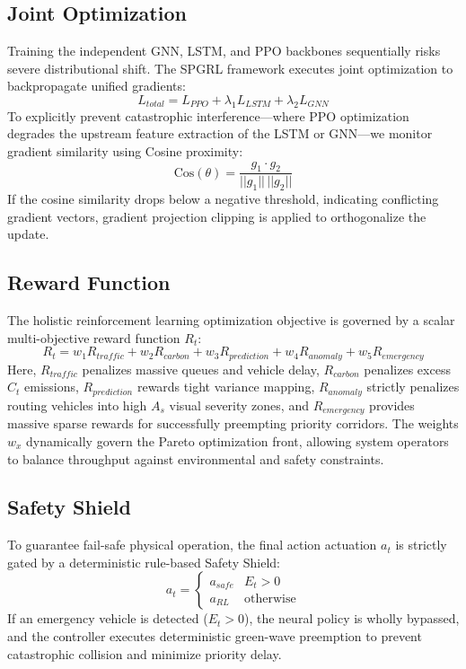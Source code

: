 \subsection{Joint Optimization}
Training the independent GNN, LSTM, and PPO backbones sequentially risks severe distributional shift. The SPGRL framework executes joint optimization to backpropagate unified gradients:
\begin{equation}
L_{total} = L_{PPO} + \lambda_1 L_{LSTM} + \lambda_2 L_{GNN}
\end{equation}
To explicitly prevent catastrophic interference—where PPO optimization degrades the upstream feature extraction of the LSTM or GNN—we monitor gradient similarity using Cosine proximity:
\begin{equation}
\text{Cos}(\theta) = \frac{g_1 \cdot g_2}{||g_1|| \, ||g_2||}
\end{equation}
If the cosine similarity drops below a negative threshold, indicating conflicting gradient vectors, gradient projection clipping is applied to orthogonalize the update.

\subsection{Reward Function}
The holistic reinforcement learning optimization objective is governed by a scalar multi-objective reward function $R_t$:
\begin{equation}
R_t = w_1 R_{traffic} + w_2 R_{carbon} + w_3 R_{prediction} + w_4 R_{anomaly} + w_5 R_{emergency}
\end{equation}
Here, $R_{traffic}$ penalizes massive queues and vehicle delay, $R_{carbon}$ penalizes excess $C_t$ emissions, $R_{prediction}$ rewards tight variance mapping, $R_{anomaly}$ strictly penalizes routing vehicles into high $A_s$ visual severity zones, and $R_{emergency}$ provides massive sparse rewards for successfully preempting priority corridors. The weights $w_x$ dynamically govern the Pareto optimization front, allowing system operators to balance throughput against environmental and safety constraints.

\subsection{Safety Shield}
To guarantee fail-safe physical operation, the final action actuation $a_t$ is strictly gated by a deterministic rule-based Safety Shield:
\begin{equation}
a_t = 
\begin{cases} 
a_{safe} & E_t > 0 \\
a_{RL} & \text{otherwise} 
\end{cases}
\end{equation}
If an emergency vehicle is detected ($E_t > 0$), the neural policy is wholly bypassed, and the controller executes deterministic green-wave preemption to prevent catastrophic collision and minimize priority delay.

